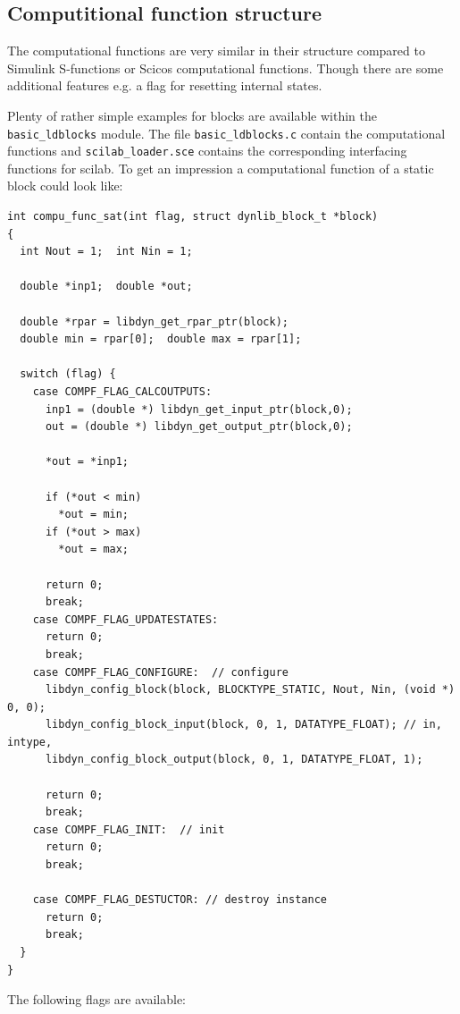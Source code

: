 \documentclass[%
	pdftex,%
	a4paper,%
	oneside,%
	11pt,%
	halfparskip,%
	headsepline,%
	bibtotocnumbered,%
	idxtotoc%
]{scrartcl}
\begin{document}
\subsection{Computitional function structure}

The computational functions are very similar in their structure compared to Simulink S-functions or Scicos computational functions. Though there are some additional features e.g. a flag for resetting internal states.

Plenty of rather simple examples for blocks are available within the \texttt{basic\_ldblocks} module. The file \texttt{basic\_ldblocks.c} contain the computational functions  and \texttt{scilab\_loader.sce} contains the corresponding interfacing functions for scilab.
To get an impression a computational function of a static block could look like:

\begin{verbatim}
int compu_func_sat(int flag, struct dynlib_block_t *block)
{
  int Nout = 1;  int Nin = 1;

  double *inp1;  double *out;	

  double *rpar = libdyn_get_rpar_ptr(block);
  double min = rpar[0];  double max = rpar[1];

  switch (flag) {
    case COMPF_FLAG_CALCOUTPUTS:
      inp1 = (double *) libdyn_get_input_ptr(block,0);
      out = (double *) libdyn_get_output_ptr(block,0);
      
      *out = *inp1;
      
      if (*out < min)
        *out = min;
      if (*out > max)
        *out = max;
      
      return 0;
      break;
    case COMPF_FLAG_UPDATESTATES:
      return 0;
      break;
    case COMPF_FLAG_CONFIGURE:  // configure
      libdyn_config_block(block, BLOCKTYPE_STATIC, Nout, Nin, (void *) 0, 0); 
      libdyn_config_block_input(block, 0, 1, DATATYPE_FLOAT); // in, intype, 
      libdyn_config_block_output(block, 0, 1, DATATYPE_FLOAT, 1);

      return 0;
      break;
    case COMPF_FLAG_INIT:  // init
      return 0;
      break;

    case COMPF_FLAG_DESTUCTOR: // destroy instance
      return 0;
      break;
  }
}
\end{verbatim}


The following flags are available:
\end{document}
